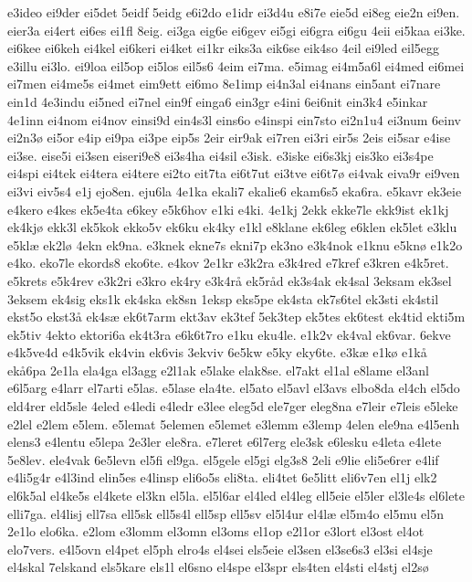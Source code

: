 {e3ideo
ei9der
ei5det
5eidf
5eidg
e6i2do
e1idr
ei3d4u
e8i7e
eie5d
ei8eg
eie2n
ei9en.
eier3a
ei4ert
ei6es
ei1fl
8eig.
ei3ga
eig6e
ei6gev
ei5gi
ei6gra
ei6gu
4eii
ei5kaa
ei3ke.
ei6kee
ei6keh
ei4kel
ei6keri
ei4ket
ei1kr
eiks3a
eik6se
eik4so
4eil
ei9led
eil5egg
e3illu
ei3lo.
ei9loa
eil5op
ei5los
eil5s6
4eim
ei7ma.
e5imag
ei4m5a6l
ei4med
ei6mei
ei7men
ei4me5s
ei4met
eim9ett
ei6mo
8e1imp
ei4n3al
ei4nans
ein5ant
ei7nare
ein1d
4e3indu
ei5ned
ei7nel
ein9f
einga6
ein3gr
e4ini
6ei6nit
ein3k4
e5inkar
4e1inn
ei4nom
ei4nov
einsi9d
ein4s3l
eins6o
e4inspi
ein7sto
ei2n1u4
ei3num
6einv
ei2n3ø
ei5or
e4ip
ei9pa
ei3pe
eip5s
2eir
eir9ak
ei7ren
ei3ri
eir5s
2eis
ei5sar
e4ise
ei3se.
eise5i
ei3sen
eiseri9e8
ei3s4ha
ei4sil
e3isk.
e3iske
ei6s3kj
eis3ko
ei3s4pe
ei4spi
ei4tek
ei4tera
ei4tere
ei2to
eit7ta
ei6t7ut
ei3tve
ei6t7ø
ei4vak
eiva9r
ei9ven
ei3vi
eiv5s4
e1j
ejo8en.
eju6la
4e1ka
ekali7
ekalie6
ekam6s5
eka6ra.
e5kavr
ek3eie
e4kero
e4kes
ek5e4ta
e6key
e5k6hov
e1ki
e4ki.
4e1kj
2ekk
ekke7le
ekk9ist
ek1kj
ek4kjø
ekk3l
ek5kok
ekko5v
ek6ku
ek4ky
e1kl
e8klane
ek6leg
e6klen
ek5let
e3klu
e5klæ
ek2lø
4ekn
ek9na.
e3knek
ekne7s
ekni7p
ek3no
e3k4nok
e1knu
e5knø
e1k2o
e4ko.
eko7le
ekords8
eko6te.
e4kov
2e1kr
e3k2ra
e3k4red
e7kref
e3kren
e4k5ret.
e5krets
e5k4rev
e3k2ri
e3kro
ek4ry
e3k4rå
ek5råd
ek3s4ak
ek4sal
3eksam
ek3sel
3eksem
ek4sig
eks1k
ek4ska
ek8sn
1eksp
eks5pe
ek4sta
ek7s6tel
ek3sti
ek4stil
ekst5o
ekst3å
ek4sæ
ek6t7arm
ekt3av
ek3tef
5ek3tep
ek5tes
ek6test
ek4tid
ekti5m
ek5tiv
4ekto
ektori6a
ek4t3ra
e6k6t7ro
e1ku
eku4le.
e1k2v
ek4val
ek6var.
6ekve
e4k5ve4d
e4k5vik
ek4vin
ek6vis
3ekviv
6e5kw
e5ky
eky6te.
e3kæ
e1kø
e1kå
ekå6pa
2e1la
ela4ga
el3agg
e2l1ak
e5lake
elak8se.
el7akt
el1al
e8lame
el3anl
e6l5arg
e4larr
el7arti
e5las.
e5lase
ela4te.
el5ato
el5avl
el3avs
elbo8da
el4ch
el5do
eld4rer
eld5sle
4eled
e4ledi
e4ledr
e3lee
eleg5d
ele7ger
eleg8na
e7leir
e7leis
e5leke
e2lel
e2lem
e5lem.
e5lemat
5elemen
e5lemet
e3lemm
e3lemp
4elen
ele9na
e4l5enh
elens3
e4lentu
e5lepa
2e3ler
ele8ra.
e7leret
e6l7erg
ele3sk
e6lesku
e4leta
e4lete
5e8lev.
ele4vak
6e5levn
el5fi
el9ga.
el5gele
el5gi
elg3s8
2eli
e9lie
eli5e6rer
e4lif
e4li5g4r
e4l3ind
elin5es
e4linsp
eli6o5s
eli8ta.
eli4tet
6e5litt
eli6v7en
el1j
elk2
el6k5al
el4ke5s
el4kete
el3kn
el5la.
el5l6ar
el4led
el4leg
ell5eie
el5ler
el3le4s
el6lete
elli7ga.
el4lisj
ell7sa
ell5sk
ell5s4l
ell5sp
ell5sv
el5l4ur
el4læ
el5m4o
el5mu
el5n
2e1lo
elo6ka.
e2lom
e3lomm
el3omn
el3oms
el1op
e2l1or
e3lort
el3ost
el4ot
elo7vers.
e4l5ovn
el4pet
el5ph
elro4s
el4sei
els5eie
el3sen
el3se6s3
el3si
el4sje
el4skal
7elskand
els5kare
els1l
el6sno
el4spe
el3spr
els4ten
el4sti
el4stj
el2sø
}
